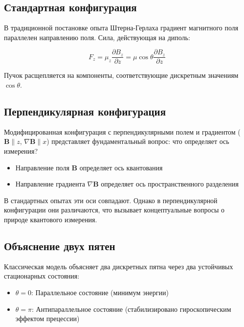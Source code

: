 \documentclass[12pt]{article}
\begin{document}
\subsection{Стандартная конфигурация}

В традиционной постановке опыта Штерна-Герлаха градиент магнитного поля параллелен направлению поля. Сила, действующая на диполь:

\begin{equation}
F_z = \mu_z \frac{\partial B_z}{\partial z} = \mu \cos\theta \frac{\partial B_z}{\partial z}
\end{equation}

Пучок расщепляется на компоненты, соответствующие дискретным значениям $\cos\theta$.

\subsection{Перпендикулярная конфигурация}

Модифицированная конфигурация с перпендикулярными полем и градиентом ($\boldsymbol{B} \parallel z$, $\nabla\boldsymbol{B} \parallel x$) представляет фундаментальный вопрос: что определяет ось измерения?

\begin{itemize}
\item Направление поля $\boldsymbol{B}$ определяет ось квантования
\item Направление градиента $\nabla\boldsymbol{B}$ определяет ось пространственного разделения
\end{itemize}

В стандартных опытах эти оси совпадают. Однако в перпендикулярной конфигурации они различаются, что вызывает концептуальные вопросы о природе квантового измерения.

\subsection{Объяснение двух пятен}

Классическая модель объясняет два дискретных пятна через два устойчивых стационарных состояния:

\begin{itemize}
\item $\theta = 0$: Параллельное состояние (минимум энергии)
\item $\theta = \pi$: Антипараллельное состояние (стабилизировано гироскопическим эффектом прецессии)
\end{itemize}
\end{document}
